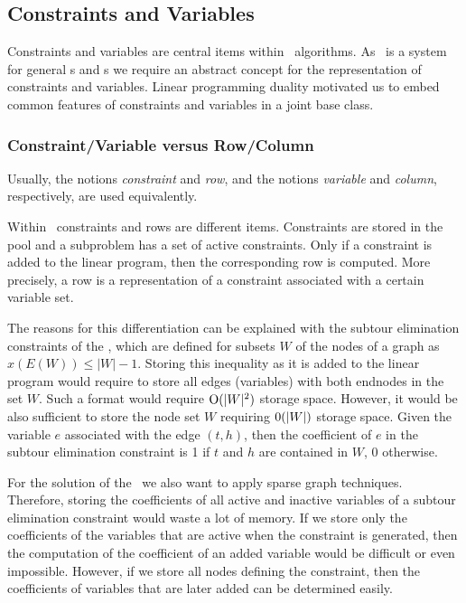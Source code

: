 \subsection{Constraints and Variables}
\label{section:ConstraintsAndVariables}

Constraints and variables are central items within \lpbab\ algorithms.
As \ABACUS\ is a system for general \mip s and \cop s we require 
an abstract concept for the representation of constraints and variables.
Linear programming duality motivated us to embed common features of constraints
and variables in a joint base class. 

\subsubsection{Constraint/Variable versus Row/Column}

Usually, the notions {\it constraint\/} and {\it row}, and the
notions {\it variable\/} and {\it column\/}, respectively,
are used equivalently. 

Within \ABACUS\ constraints and rows are different items. Constraints
are stored in the pool and a subproblem has a set of active constraints.
Only if a constraint is added to the linear program, then the
corresponding row is computed. More precisely, a row is a representation
of a constraint associated with a certain variable set. 

The reasons
for this differentiation can be explained with the subtour elimination 
constraints 
of the \tsp, which are defined for subsets $W$ of the nodes
of a graph as
$x(E(W)) \le |W|-1$. Storing this inequality  as it is added
to the linear program would require to store all edges (variables)
with both endnodes in the set $W$. Such a format would require
$\hbox{O}(|W|^2)$ storage space. However, it would be also sufficient
to store the node set $W$ requiring $\hbox{0}(|W|)$ storage space.
Given the variable $e$ associated with the edge $(t,h)$, then the coefficient
of $e$ in the subtour elimination constraint is 1 if $t$ and $h$ are
contained in $W$, 0 otherwise.

For the solution of the \tsp\ we also want to apply sparse graph techniques.
Therefore, storing the coefficients of all active and inactive
variables of a subtour elimination constraint
would waste a lot of memory. If we store only
the coefficients of the variables that are active when the
constraint is generated, then the computation of the
coefficient of an added variable would be difficult or even impossible.
However, if we store all nodes defining the constraint, then the coefficients
of variables that are later added can be determined easily.

